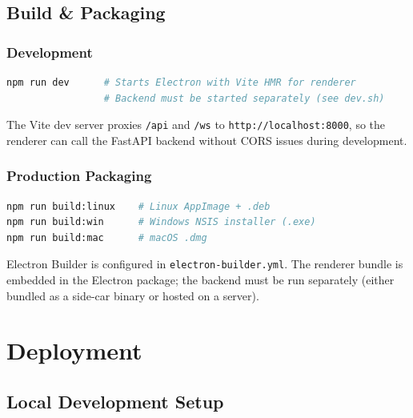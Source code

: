 \documentclass[11pt,a4paper,twoside,openright]{book}
\begin{document}
\section{Build \& Packaging}

\subsection{Development}

\begin{codebox}
\begin{lstlisting}[language=bash, numbers=none]
npm run dev      # Starts Electron with Vite HMR for renderer
                 # Backend must be started separately (see dev.sh)
\end{lstlisting}
\end{codebox}

The Vite dev server proxies \texttt{/api} and \texttt{/ws} to \texttt{http://localhost:8000}, so the renderer can call the FastAPI backend without CORS issues during development.

\subsection{Production Packaging}

\begin{codebox}
\begin{lstlisting}[language=bash, numbers=none]
npm run build:linux    # Linux AppImage + .deb
npm run build:win      # Windows NSIS installer (.exe)
npm run build:mac      # macOS .dmg
\end{lstlisting}
\end{codebox}

Electron Builder is configured in \texttt{electron-builder.yml}. The renderer bundle is embedded in the Electron package; the backend must be run separately (either bundled as a side-car binary or hosted on a server).

\chapter{Deployment}

\section{Local Development Setup}
\end{document}
